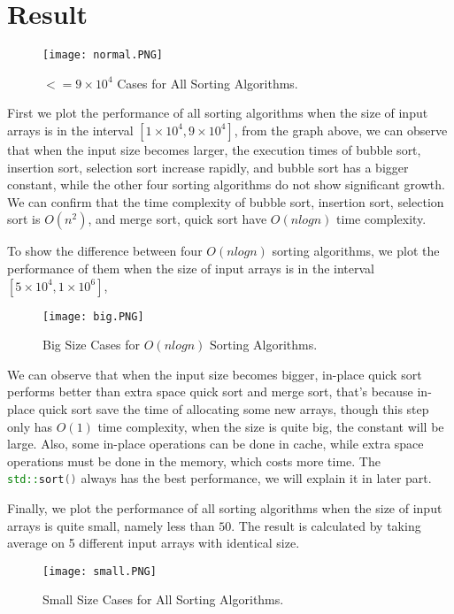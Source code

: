 \documentclass[14pt]{article}
\begin{document}
\section{Result}

\begin{figure}[H]
	\centerline{\texttt{[image: normal.PNG]}}
	\caption{$<= 9 \times 10^4$ Cases for All Sorting Algorithms.}
\end{figure}

First we plot the performance of all sorting algorithms when the size of input arrays is in the interval $[1\times 10^4, 9\times 10^4]$, from 
the graph above, we can observe that when the input size becomes larger, the execution times of bubble sort, insertion sort, selection sort 
increase rapidly, and bubble sort has a bigger constant, while the other four sorting algorithms do not show significant growth. We can 
confirm that the time complexity of bubble sort, insertion sort, selection sort is $O(n^2)$, and merge sort, quick sort have $O(nlogn)$ time complexity.

To show the difference between four $O(nlogn)$ sorting algorithms, we plot the performance of them when the size of input arrays is in the interval $[5\times 10^4, 1\times 10^6]$,

\begin{figure}[H]
	\centerline{\texttt{[image: big.PNG]}}
	\caption{Big Size Cases for $O(nlogn)$ Sorting Algorithms.}
\end{figure}

We can observe that when the input size becomes bigger, in-place quick sort performs better than extra space quick sort and merge sort, that's because in-place 
quick sort save the time of allocating some new arrays, though this step only has $O(1)$ time complexity, when the size 
is quite big, the constant will be large. Also, some in-place operations can be done in cache, while extra space operations must 
be done in the memory, which costs more time. The \lstinline[language=c++]|std::sort()| always has the best performance, we will explain it in later part.

Finally, we plot the performance of all sorting algorithms when the size of input arrays is quite small, namely less than $50$. The 
result is calculated by taking average on 5 different input arrays with identical size.

\begin{figure}[H]
	\centerline{\texttt{[image: small.PNG]}}
	\caption{Small Size Cases for All Sorting Algorithms.}
\end{figure}
\end{document}
